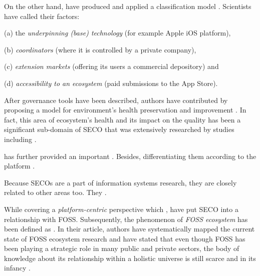 On the other hand, \textcite[55]{Jansen2013DefiningGovernance} have produced and applied a classification model .
Scientists have called their factors: 
%
\begin{compactitem}
    \item [(a)] the \emph{underpinning (base) technology} (for example Apple iOS platform),
    \item [(b)] \emph{coordinators} (where it is controlled by a private company),
    \item [(c)] \emph{extension markets} (offering its users a commercial depository) and 
    \item [(d)] \emph{accessibility to an ecosystem} (paid submissions to the App Store).
\end{compactitem}
%
After governance tools have been described, authors have contributed by proposing a model for environment's health preservation and improvement \parencite{Jansen2013DefiningGovernance}. 
In fact, this area of ecosystem's health and its impact on the quality has been a significant sub-domain of \ac{SECO} that was extensively researched by studies including \textcites{Iansiti2004TheSustainability}{denHartigh2006TheEcosystem}{Jansen2014MeasuringHealth}.

\textcite{Bosch2009FromEcosystems} has further provided an important . 
Besides, differentiating them according to the platform  \parencite[4]{Plakidas2017EvolutionQualities}.

Because \acp{SECO} are a part of information systems research, they are closely related to other areas too. 
They  \parencites{Barbosa201359}[29]{Manikas2016RevisitingStudy}.

While covering a \emph{platform-centric} perspective which , \textcite[3]{Franco-Bedoya2017OpenMapping} have put \ac{SECO} into a relationship with \ac{FOSS}.
Subsequently, the phenomenon of \emph{FOSS ecosystem} has been defined as  \parencite[24]{Franco-Bedoya2017OpenMapping}.
In their article, authors have systematically mapped the current state of \acs{FOSS} ecosystem research and have stated that even though \ac{FOSS} has been playing a strategic role in many public and private sectors, the body of knowledge about its relationship within a holistic universe is still scarce and in its infancy \parencites{Franco-Bedoya2017OpenMapping}{PetrovAarhus16}.

